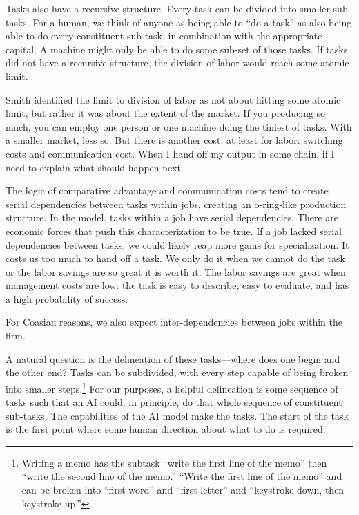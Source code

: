 \documentclass{article}
\begin{document}
Tasks also have a recursive structure.
Every task can be divided into smaller sub-tasks.
For a human, we think of anyone as being able to ``do a task'' as also being able to do every constituent sub-task, in combination with the appropriate capital.
A machine might only be able to do some sub-set of those tasks. 
If tasks did not have a recursive structure, the division of labor would reach some atomic limit. 

Smith identified the limit to division of labor as not about hitting some atomic limit, but rather it was about the extent of the market. 
If you producing so much, you can employ one person or one machine doing the tiniest of tasks.
With a smaller market, less so.
But there is another cost, at least for labor: switching costs and communication cost.
When I hand off my output in some chain, if I need to explain what should happen next.

The logic of comparative advantage and communication costs tend to create serial dependencies between tasks within jobs, creating an o-ring-like production structure.
In the model, tasks within a job have serial dependencies. 
There are economic forces that push this characterization to be true. 
If a job lacked serial dependencies between tasks, we could likely reap more gains for specialization.
It costs us too much to hand off a task.
We only do it when we cannot do the task or the labor savings are so great it is worth it. 
The labor savings are great when management costs are low: the task is easy to describe, easy to evaluate, and has a high probability of success. 

For Coasian reasons, we also expect inter-dependencies between jobs within the firm.

A natural question is the delineation of these tasks---where does one begin and the other end? 
Tasks can be subdivided, with every step capable of being broken into smaller steps.\footnote{
    Writing a memo has the subtask ``write the first line of the memo'' then ``write the second line of the memo.''
    ``Write the first line of the memo'' and can be broken into ``first word'' and ``first letter'' and ``keystroke down, then keystroke up.''    
}
For our purposes, a helpful delineation is some sequence of tasks such that an AI could, in principle, do that whole sequence of constituent sub-tasks.
The capabilities of the AI model make the tasks. 
The start of the task is the first point where some human direction about what to do is required. 
\end{document}

